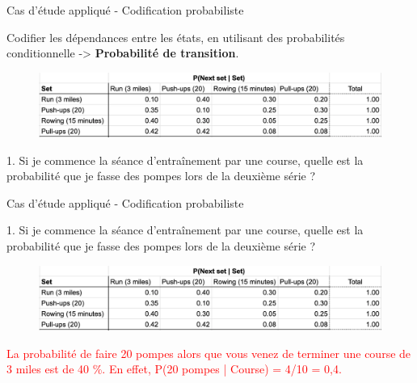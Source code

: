 \documentclass[aspectratio=169,xcolor=dvipsnames, t]{beamer}
\begin{document}
\begin{frame}{Cas d'étude appliqué - Codification probabiliste}

Codifier les dépendances entre les états, en utilisant des probabilités conditionnelle -> \textbf{Probabilité de transition}.

\begin{figure}
	\includegraphics[height=0.3\paperheight]{figures/entrainementLogsEnconded.png}
\end{figure}

1. Si je commence la séance d'entraînement par une course, quelle est la probabilité que je fasse des pompes lors de la deuxième série ?


\end{frame}

\begin{frame}{Cas d'étude appliqué - Codification probabiliste}
	
	1. Si je commence la séance d'entraînement par une course, quelle est la probabilité que je fasse des pompes lors de la deuxième série ?

	\begin{figure}
		\includegraphics[height=0.3\paperheight]{figures/entrainementLogsEnconded.png}
	\end{figure}
	\textcolor{red}{La probabilité de faire 20 pompes alors que vous venez de terminer une course de 3 miles est de 40 \%. En effet, P(20 pompes | Course) = 4/10 = 0,4.}
	
\end{frame}
\end{document}
